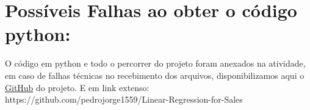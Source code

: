 \documentclass[a4paper,12pt]{article}
\begin{document}
\section{Possíveis Falhas ao obter o código python:}
O código em python e todo o percorrer do projeto foram anexados na atividade, em caso de falhas técnicas no recebimento dos arquivos, disponibilizamos aqui o \href{https://github.com/pedrojorge1559/Linear-Regression-for-Sales}{GitHub} do projeto.
\newline E em link extenso: https://github.com/pedrojorge1559/Linear-Regression-for-Sales
\end{document}
